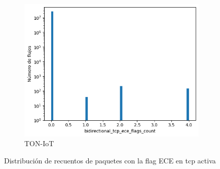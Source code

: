 \begin{figure}[H]
    \begin{subfigure}[b]{0.32\textwidth}
        \centering
        \includegraphics[width=\linewidth]{media/packet_pincer_toniot/bidirectional_tcp_ece_flags_count_linear_x_log_y.png}
        \caption{TON-IoT}
    \end{subfigure}
       \caption{Distribución de recuentos de paquetes con la flag ECE en \acrshort{tcp} activa}
       \label{fig:packet_pincer_bidirectional_tcp_ece_flags_count}
\end{figure}

